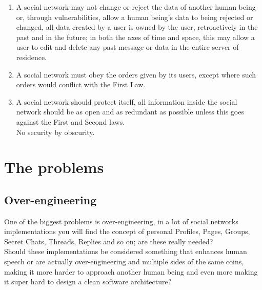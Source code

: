 \documentclass[12pt]{article}
\begin{document}
\begin{enumerate}
\item A social network may not change or reject the data of another human being or, through vulnerabilities, allow a human being's data to being rejected or changed, all data created by a user is owned by the user, retroactively in the past and in the future; in both the axes of time and space, this may allow a user to edit and delete any past message or data in the entire server of residence.
\item A social network must obey the orders given by its users, except where such orders would conflict with the First Law.
\item A social network should protect itself, all information inside the social network should be as open and as redundant as possible unless this goes against the First and Second laws. \\
No security by obscurity.
 


\end{enumerate}



\section{The problems}


\subsection*{Over-engineering}
One of the biggest problems is over-engineering, in a lot of social networks implementations you will find the concept of personal Profiles, Pages, Groups, Secret Chats, Threads, Replies and so on; are these really needed? \\
Should these implementations be considered something that enhances human speech or are actually over-engineering and multiple sides of the same coins, making it more harder to approach another human being and even more making it super hard to design a clean software architecture?
\end{document}
